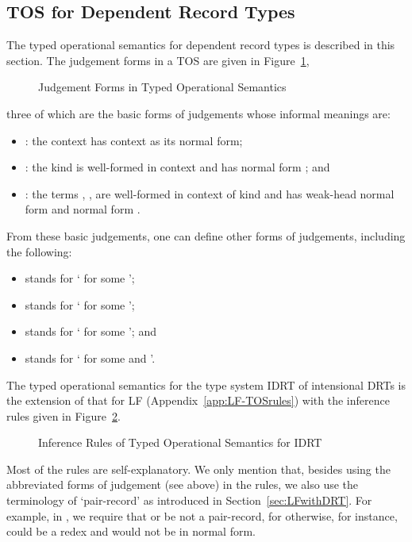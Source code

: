 \documentclass[submission,copyright,creativecommons]{eptcs}
\begin{document}
\subsection{TOS for Dependent Record Types}
\label{sec:TOS-IDRT}

The typed operational semantics for dependent record types is described in this section.  The judgement forms in a TOS are given in Figure~\ref{TOS-judgements},
\begin{figure}[top]
\begin{minipage}{\linewidth}

\end{minipage}
\caption{Judgement Forms in Typed Operational Semantics} \label{TOS-judgements}
\end{figure}
three of which are the basic forms of judgements whose informal meanings are:
\begin{itemize}
  \item : the context  has context  as its normal form;
  \item : the kind  is well-formed in context  and has normal form ; and
  \item : the terms , ,  are well-formed in context  of kind  and  has weak-head normal form  and normal form .
\end{itemize}
From these basic judgements, one can define other forms of judgements, including the following:
\begin{itemize}
  \item  stands for ` for some ';
  \item  stands for ` for some ';
  \item  stands for ` for some '; and
  \item  stands for ` for some   and '.
\end{itemize}

The typed operational semantics for the type system IDRT of intensional DRTs is the extension of that for LF (Appendix~\ref{app:LF-TOSrules}) with the inference rules given in Figure~\ref{TOS-DRT-rules}.
\begin{figure}[top]
\caption{Inference Rules of Typed Operational Semantics for IDRT} \label{TOS-DRT-rules}
\end{figure}
Most of the rules are self-explanatory. We only mention that, besides using the abbreviated forms of judgement (see above) in the rules, we also use the terminology of `pair-record' as introduced in Section~\ref{sec:LFwithDRT}.  For example, in , we require that  or  be not a pair-record, for otherwise, for instance,  could be a redex and would not be in normal form.
\end{document}
